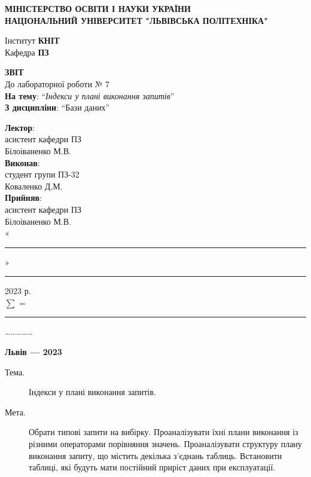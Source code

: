 \documentclass[14pt]{extreport}
\newcommand\subject{Бази даних}
\newcommand\lecturer{асистент кафедри ПЗ\\Білоіваненко М.В.}
\newcommand\teacher{асистент кафедри ПЗ\\Білоіваненко М.В.}
\newcommand\mygroup{ПЗ-32}
\newcommand\lab{7}
\newcommand\theme{Індекси у плані виконання запитів}
\newcommand\purpose{Обрати типові запити на вибірку. Проаналізувати їхні плани виконання із різними операторами порівняння значень. Проаналізувати структуру плану виконання запиту, що містить декілька з’єднань таблиць. Встановити таблиці, які будуть мати постійний приріст даних при експлуатації}
\begin{document}
\begin{normalsize}
	\begin{titlepage}
		\thispagestyle{empty}
		\begin{center}
			\textbf{МІНІСТЕРСТВО ОСВІТИ І НАУКИ УКРАЇНИ\\
				НАЦІОНАЛЬНИЙ УНІВЕРСИТЕТ "ЛЬВІВСЬКА ПОЛІТЕХНІКА"}
		\end{center}
		\begin{flushright}
			Інститут \textbf{КНІТ}\\
			Кафедра \textbf{ПЗ}
		\end{flushright}
		\vspace{200pt}
		\begin{center}
			\textbf{ЗВІТ}\\
			\vspace{10pt}
			До лабораторної роботи № \lab\\
			\textbf{На тему}: “\textit{\theme}”\\
			\textbf{З дисципліни}: “\subject”
		\end{center}
		\vspace{40pt}
		\begin{flushright}
			
			\textbf{Лектор}:\\
			\lecturer\\
			\vspace{10pt}
			\textbf{Виконав}:\\
			
			студент групи \mygroup\\
			Коваленко Д.М.\\
			\vspace{10pt}
			\textbf{Прийняв}:\\
			
			\teacher\\
			
			\vspace{28pt}
			«\rule{1cm}{0.15mm}» \rule{1.5cm}{0.15mm} 2023 р.\\
			$\sum$ = \rule{1cm}{0.15mm}……………\\
			
		\end{flushright}
		\vspace{\fill}
		\begin{center}
			\textbf{Львів — 2023}
		\end{center}
	\end{titlepage}
		
	\begin{description}
		\item[Тема.] \theme.
		\item[Мета.] \purpose.
	\end{description}


\end{normalsize}
\end{document}
